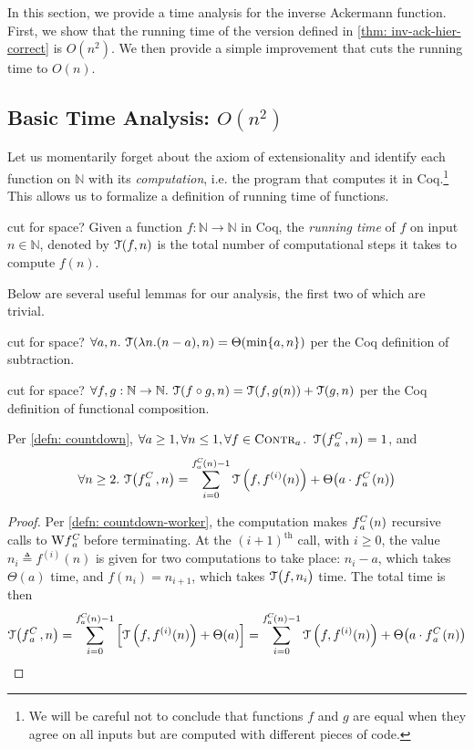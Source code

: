 In this section, we provide a time analysis for the 
inverse Ackermann function. First, we show that the 
running time of the version defined in \cref{thm: inv-ack-hier-correct}
is $O(n^2)$. We then provide a simple improvement that 
cuts the running time to $O(n)$.

\subsection{Basic Time Analysis: $O(n^2)$}
Let us momentarily forget about the axiom of extensionality and identify each 
function on $\mathbb{N}$ with its \emph{computation}, i.e. the program that 
computes it in Coq.\footnote{We will be careful not to conclude that functions 
$f$ and $g$ are equal when they agree on all inputs but are computed with 
different pieces of code.} This allows us to formalize a definition of 
running time of functions.
\begin{defn}
	{\color{red}cut for space?} Given a function $f:\mathbb{N}\to\mathbb{N}$ in Coq, the \emph{running time} of $f$ on input $n\in \mathbb{N}$, denoted by $\mathcal{T}(f, n)$ is the total number of computational steps it takes to compute $f(n)$.
\end{defn}
Below are several useful lemmas for our analysis, the first two of which are trivial.
\begin{lem} \label{lem: sub-runtime}
	{\color{red}cut for space?} $\forall a, n.~ \mathcal{T}(\lambda n.(n - a), n) = \Theta(\min\{a, n\})$ per the Coq definition of subtraction.
\end{lem}
\begin{lem} \label{lem: compose-runtime}
	{\color{red}cut for space?} $\forall f, g: \mathbb{N}\to \mathbb{N}.~\mathcal{T}(f\circ g, n) = \mathcal{T}(f, g(n)) + \mathcal{T}(g, n)$ per the Coq definition of functional composition. 
\end{lem}
\begin{lem} \label{lem: cdt-runtime}
	Per \cref{defn: countdown}, $\forall a\ge 1, \forall n\le 1, \forall f\in \text{\scshape{Contr}}_{a}$.~$\runtime\big(\cdt{f}{a}\ , n\big) = 1$, and
	\begin{equation*}
	\forall n\ge 2.~\runtime\big(\cdt{f}{a}\ , n\big) = \sum_{i=0}^{\cdt{f}{a}(n) - 1} \runtime\left(f, f^{(i)}(n)\right) + \Theta\big(a\cdot \cdt{f}{a}(n)\big)
	\end{equation*}
\end{lem}
\begin{proof}
	Per \cref{defn: countdown-worker}, the computation makes $\cdt{f}{a}(n)$ recursive calls to $\W\cdt{f}{a}$ before terminating. At the $(i+1)^{\text{th}}$ call, with $i\ge 0$, {\color{red}the value $n_i \triangleq f^{(i)}(n)$ is given for two computations to take place:} $n_i - a$, which takes $\Theta(a)$ time, and $f(n_i) = n_{i+1}$, which takes $\mathcal{T}\big(f, n_i\big)$ time. The total time is then
	\begin{equation*}
	\runtime\big(\cdt{f}{a}\ , n\big)
	= \sum_{i=0}^{\cdt{f}{a}(n) - 1} \left[\runtime\left(f, f^{(i)}(n)\right) + \Theta(a)\right]
	= \sum_{i=0}^{\cdt{f}{a}(n) - 1} \runtime\left(f, f^{(i)}(n)\right) + \Theta\big(a\cdot \cdt{f}{a}(n)\big)
	\end{equation*}
\end{proof}
